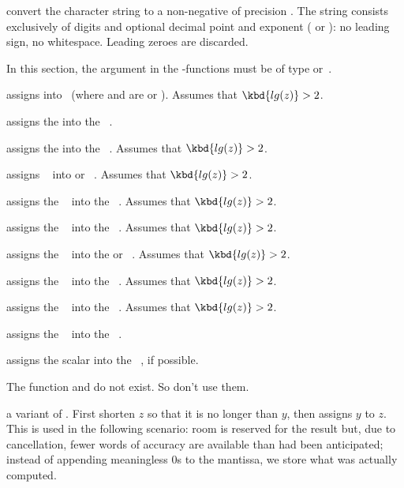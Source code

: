  convert the character string  to
a non-negative  of precision . The string 
consists exclusively of digits and optional decimal point and exponent
( or ): no leading sign, no whitespace. Leading zeroes are
discarded.

In this section, the  argument in the -functions must be of type
 or~.

 assigns  into~ (where 
and  are  or ).
Assumes that $\kbd{lg(z)} > 2$.

 assigns the   into the
~.

 assigns the   into the
~. Assumes that $\kbd{lg(z)} > 2$.

 assigns ~ into  or
~. Assumes that $\kbd{lg(z)} > 2$.

 assigns the ~ into the
~. Assumes that $\kbd{lg(z)} > 2$.

 assigns the ~ into the
~. Assumes that $\kbd{lg(z)} > 2$.

 assigns the ~ into the
 or ~. Assumes that $\kbd{lg(z)} > 2$.

 assigns the ~ into the
~. Assumes that $\kbd{lg(z)} > 2$.

 assigns the ~ into the
~. Assumes that $\kbd{lg(z)} > 2$.

 assigns the ~ into the
~.

 assigns the scalar  into the
~, if possible.

\noindent The function  and  do not exist. So don't use
them.

 a variant of . First shorten
$z$ so that it is no longer than $y$, then assigns $y$ to $z$. This is used
in the following scenario: room is reserved for the result but, due to
cancellation, fewer words of accuracy are available than had been
anticipated; instead of appending meaningless $0$s to the mantissa, we store
what was actually computed.

